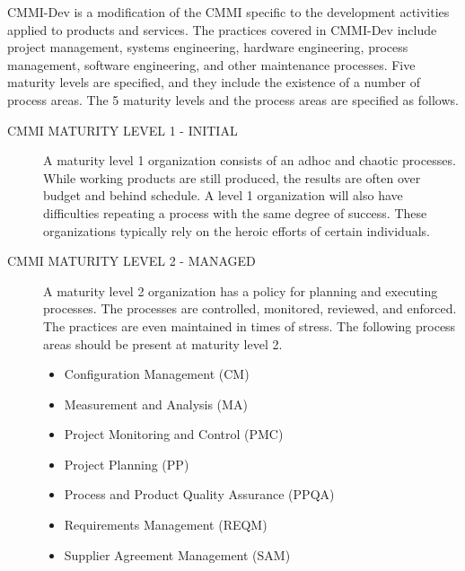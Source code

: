 \documentclass[SDSUThesis.tex]{subfiles}
\begin{document}
    CMMI-Dev is a modification of the CMMI specific to the 
    development activities applied to products
    and services.  The practices covered in 
    CMMI-Dev include project management, 
    systems engineering, hardware engineering, process 
    management, software engineering, and 
    other maintenance processes.  Five maturity levels are 
    specified, and they include the 
    existence of a number of process areas.  The 5 maturity 
    levels and the process areas are specified as follows.

    \begin{description}
        \item[CMMI MATURITY LEVEL 1 - INITIAL]
            A maturity level 1 organization consists of an
                adhoc and chaotic processes.  While working
                products are still produced, the results are 
                often over budget and behind schedule.  A level
                1 organization will also have difficulties 
                repeating a process with the same degree of 
                success.  These organizations typically rely 
                on the heroic efforts of certain individuals. 
            
        \item[CMMI MATURITY LEVEL 2 - MANAGED]
            A maturity level 2 organization has a policy for 
            planning and executing processes.  
            The processes are controlled, monitored, 
            reviewed, and enforced.  The practices are even
            maintained in times of stress.  The following 
            process areas should be present at maturity
            level 2.
            \begin{itemize}
                \item Configuration Management (CM)
                \item Measurement and Analysis (MA)
                \item Project Monitoring and Control (PMC)
                \item Project Planning (PP)
                \item Process and Product Quality Assurance (PPQA)
                \item Requirements Management (REQM)
                \item Supplier Agreement Management (SAM)
            \end{itemize}


\end{description}
\end{document}
